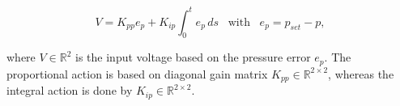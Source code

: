 \begin{equation}
    V = K_{pp}e_p + K_{ip} \int_0^t e_p \hspace{2pt} ds \hspace{10pt} \text{with} \hspace{10pt} e_p = p_{set} - p,
\end{equation}

where $V \in \mathbb{R}^2$ is the input voltage based on the pressure error $e_p$. The proportional action is based on diagonal gain matrix $K_{pp} \in \mathbb{R}^{2\times 2}$, whereas the integral action is done by $K_{ip} \in \mathbb{R}^{2\times 2}$.









































